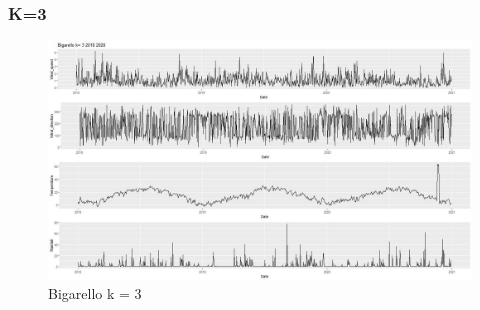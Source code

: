 \documentclass{article}
\begin{document}
\subsubsection{K=3}
\begin{figure}[H]
  \centering 
  \includegraphics[scale = 0.3]{Picture/3/Bigarello k= 3 2018 2020 .jpeg}
  \caption{Bigarello k = 3}
  \centering
\end{figure}
\end{document}
